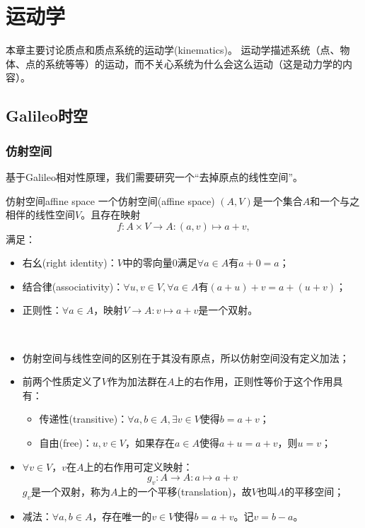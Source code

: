 \chapter{运动学}

本章主要讨论质点和质点系统的运动学(kinematics)。
运动学描述系统（点、物体、点的系统等等）的运动，而不关心系统为什么会这么运动（这是动力学的内容）。

\section{Galileo时空}

\subsection{仿射空间}

基于Galileo相对性原理，我们需要研究一个“去掉原点的线性空间”。
\begin{definition}{仿射空间}{affine space}
    一个仿射空间(affine space) $(A,V)$是一个集合$A$和一个与之相伴的线性空间$V$。且存在映射
    \begin{equation}
        f:A\times V\to A:(a,v)\mapsto a+v,
    \end{equation}
    满足：
    \begin{itemize}
        \item 右幺(right identity)：$V$中的零向量0满足$\forall a\in A$有$a+0=a$；
        \item 结合律(associativity)：$\forall u,v\in V,\forall a\in A$有$(a+u)+v=a+(u+v)$；
        \item 正则性：$\forall a\in A$，映射$V\to A:v\mapsto a+v$是一个双射。
    \end{itemize}
\end{definition}
\begin{remark}~
    \begin{itemize}
        \item 仿射空间与线性空间的区别在于其没有原点，所以仿射空间没有定义加法；
        \item 前两个性质定义了$V$作为加法群在$A$上的右作用，正则性等价于这个作用具有：
        \begin{itemize}
            \item 传递性(transitive)：$\forall a,b\in A,\exists v\in V$使得$b=a+v$；
            \item 自由(free)：$u,v\in V$，如果存在$a\in A$使得$a+u=a+v$，则$u=v$；
        \end{itemize}
        \item $\forall v\in V$，$v$在$A$上的右作用可定义映射：
        \[
            g_v:A\to A:a\mapsto a+v
        \]
        $g_v$是一个双射，称为$A$上的一个平移(translation)，故$V$也叫$A$的平移空间；
        \item 减法：$\forall a,b\in A$，存在唯一的$v\in V$使得$b=a+v$。记$v=b-a$。
    \end{itemize}
\end{remark}
